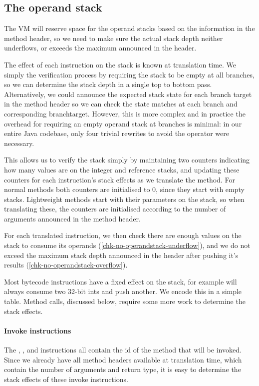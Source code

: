 \subsection{The operand stack}
The VM will reserve space for the operand stacks based on the information in the method header, so we need to make sure the actual stack depth neither underflows, or exceeds the maximum announced in the header.

The effect of each instruction on the stack is known at translation time. We simply the verification process by requiring the stack to be empty at all branches, so we can determine the stack depth in a single top to bottom pass. Alternatively, we could announce the expected stack state for each branch target in the method header so we can check the state matches at each branch and corresponding branchtarget. However, this is more complex and in practice the overhead for requiring an empty operand stack at branches is minimal: in our entire Java codebase, only four trivial rewrites to avoid the  operator were necessary.

This allows us to verify the stack simply by maintaining two counters indicating how many values are on the integer and reference stacks, and updating these counters for each instruction's stack effects as we translate the method. For normal methods both counters are initialised to 0, since they start with empty stacks. Lightweight methods start with their parameters on the stack, so when translating these, the counters are initialised according to the number of arguments announced in the method header.

For each translated instruction, we then check there are enough values on the stack to consume its operands (\ref{chk-no-operandstack-underflow}), and we do not exceed the maximum stack depth announced in the header after pushing it's results (\ref{chk-no-operandstack-overflow}).

Most bytecode instructions have a fixed effect on the stack, for example  will always consume two 32-bit ints and push another. We encode this in a simple table. Method calls, discussed below, require some more work to determine the stack effects. 

\paragraph{Invoke instructions}
The , , and  instructions all contain the id of the method that will be invoked. Since we already have all method headers available at translation time, which contain the number of arguments and return type, it is easy to determine the stack effects of these invoke instructions.
 
